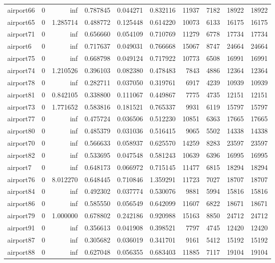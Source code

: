 \begin{longtable}{|l|r|r|r|r|r|r|r|r|r|}
airport66 & 0 & inf & 0.787845 & 0.044271 & 0.832116 & 11937 & 7182 & 18922 & 18922 \\
airport65 & 0 & 1.285714 & 0.488772 & 0.125448 & 0.614220 & 10073 & 6133 & 16175 & 16175 \\
airport71 & 0 & inf & 0.656660 & 0.054109 & 0.710769 & 11279 & 6778 & 17734 & 17734 \\
airport6 & 0 & inf & 0.717637 & 0.049031 & 0.766668 & 15067 & 8747 & 24664 & 24664 \\
airport75 & 0 & inf & 0.668798 & 0.049124 & 0.717922 & 10773 & 6508 & 16991 & 16991 \\
airport74 & 0 & 1.210526 & 0.396103 & 0.082380 & 0.478483 & 7843 & 4886 & 12364 & 12364 \\
airport78 & 0 & inf & 0.282711 & 0.037050 & 0.319761 & 6917 & 4239 & 10939 & 10939 \\
airport81 & 0 & 0.842105 & 0.338800 & 0.111067 & 0.449867 & 7775 & 4735 & 12151 & 12151 \\
airport73 & 0 & 1.771652 & 0.583816 & 0.181521 & 0.765337 & 9931 & 6119 & 15797 & 15797 \\
airport77 & 0 & inf & 0.475724 & 0.036506 & 0.512230 & 10851 & 6363 & 17665 & 17665 \\
airport80 & 0 & inf & 0.485379 & 0.031036 & 0.516415 & 9065 & 5502 & 14338 & 14338 \\
airport70 & 0 & inf & 0.566633 & 0.058937 & 0.625570 & 14259 & 8283 & 23597 & 23597 \\
airport82 & 0 & inf & 0.533695 & 0.047548 & 0.581243 & 10639 & 6396 & 16995 & 16995 \\
airport7 & 0 & inf & 0.648173 & 0.066972 & 0.715145 & 11477 & 6815 & 18294 & 18294 \\
airport76 & 0 & 8.012270 & 0.648445 & 0.710846 & 1.359291 & 11723 & 7027 & 18707 & 18707 \\
airport84 & 0 & inf & 0.492302 & 0.037774 & 0.530076 & 9881 & 5994 & 15816 & 15816 \\
airport86 & 0 & inf & 0.585550 & 0.056549 & 0.642099 & 11607 & 6822 & 18671 & 18671 \\
airport79 & 0 & 1.000000 & 0.678802 & 0.242186 & 0.920988 & 15163 & 8850 & 24712 & 24712 \\
airport91 & 0 & inf & 0.356613 & 0.041908 & 0.398521 & 7797 & 4745 & 12420 & 12420 \\
airport87 & 0 & inf & 0.305682 & 0.036019 & 0.341701 & 9161 & 5412 & 15192 & 15192 \\
airport88 & 0 & inf & 0.627048 & 0.056355 & 0.683403 & 11885 & 7117 & 19104 & 19104 \\

\end{longtable}
